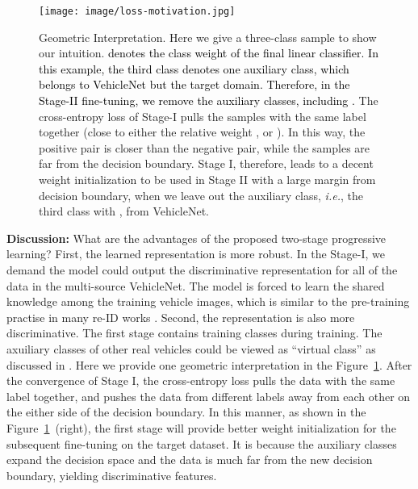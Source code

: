 \documentclass[journal]{IEEEtran}
\def\ie{\emph{i.e.}}
\newcommand{\zznote}[1]{\textcolor{black}{#1}}
\begin{document}
\begin{figure}[t]
\begin{center}
\texttt{[image: image/loss-motivation.jpg]}
\end{center}
\vspace{-.2in}
   \caption{Geometric Interpretation. Here we give a three-class sample to show our intuition. \zznote{ denotes the class weight of the final linear classifier. In this example, the third class denotes one auxiliary class, which belongs to VehicleNet but the target domain. Therefore, in the Stage-II fine-tuning, we remove the auxiliary classes, including . }
   The cross-entropy loss of Stage-I pulls the samples with the same label together (close to either the relative weight ,  or ). In this way, the positive pair is closer than the negative pair, while the samples are far from the decision boundary. Stage I, therefore, leads to a decent weight initialization to be used in Stage II with a large margin from decision boundary, when we leave out the auxiliary class, \ie, the third class with , from VehicleNet. }
\label{fig:advantage}
\end{figure}

\noindent\textbf{Discussion:} What are the advantages of the proposed two-stage progressive learning? First, the learned representation is more robust. In the Stage-I, we demand the model could output the discriminative representation for all of the data in the multi-source VehicleNet. The model is forced to learn the shared knowledge among the training vehicle images, which is similar to the pre-training practise in many re-ID works \cite{zheng2018pedestrian,hermans2017defense}. 
Second, the representation is also more discriminative. The first stage contains  training classes during training. The axuiliary classes of other real vehicles could be viewed as ``virtual class'' as discussed in \cite{chen2018virtual}. Here we provide one geometric interpretation in the Figure~\ref{fig:advantage}. After the convergence of Stage I, the cross-entropy loss pulls the data with the same label together, and pushes the data from different labels away from each other on the either side of the decision boundary. In this manner, as shown in the Figure~\ref{fig:advantage}~(right), the first stage will provide better weight initialization for the subsequent fine-tuning on the target dataset. It is because the auxiliary classes expand the decision space and the data is much far from the new decision boundary, yielding discriminative features.
\end{document}
